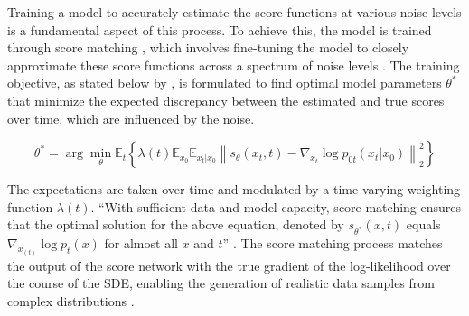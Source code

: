 Training a model to accurately estimate the score functions at various noise levels is a fundamental aspect of this process. To achieve this, the model is trained through score matching \citep{hyvarinenScoreMatching}, which involves fine-tuning the model to closely approximate these score functions across a spectrum of noise levels \citep{song2020score}. The training objective, as stated below by \citeauthor{song2020score}, is formulated to find optimal model parameters \( \theta^* \) that minimize the expected discrepancy between the estimated and true scores over time, which are influenced by the noise.

\[
\theta^* = \arg\min_\theta \mathbb{E}_t \left\{ \lambda(t) \mathbb{E}_{x_0} \mathbb{E}_{x_t|x_0} \left\| s_\theta(x_t, t) - \nabla_{x_t} \log p_{0t}(x_t | x_0) \right\|_2^2 \right\}
\]

 The expectations are taken over time and modulated by a time-varying weighting function \( \lambda(t) \). ``With sufficient data and model capacity, score matching ensures that the optimal solution for the above equation, denoted by \(s_{\theta^*}(x, t)\) equals \(\nabla_{x_(t)} \log p_{t}(x)\) for almost all \( x \) and \( t \)'' \citep{song2019SGM}. The score matching process matches the output of the score network with the true gradient of the log-likelihood over the course of the SDE, enabling the generation of realistic data samples from complex distributions \citep{yangdiffusionSummary}.